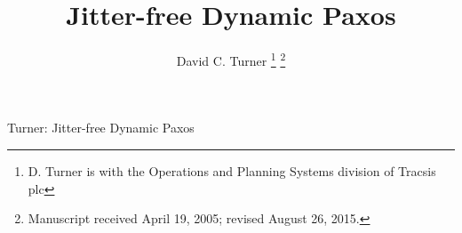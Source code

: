 \documentclass[journal]{IEEEtran}
\begin{document}
%
\title{Jitter-free Dynamic Paxos}
%
%
%

\author{David C. Turner%
\thanks{D. Turner is with the Operations and Planning Systems division of Tracsis plc
}%
\thanks{Manuscript received April 19, 2005; revised August 26, 2015.}}

% 
%



%
{Turner: Jitter-free Dynamic Paxos}
% 
\end{document}
